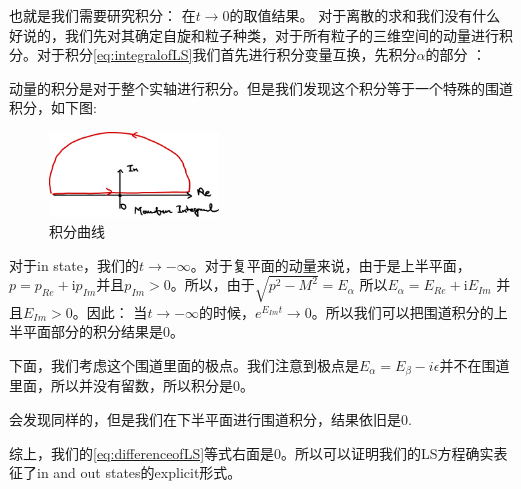 也就是我们需要研究积分：
在$ t \to 0 $的取值结果。
对于离散的求和我们没有什么好说的，我们先对其确定自旋和粒子种类，对于所有粒子的三维空间的动量进行积分。对于积分\cref{eq:integralofLS}我们首先进行积分变量互换，先积分$ \alpha $的部分 ：

动量的积分是对于整个实轴进行积分。但是我们发现这个积分等于一个特殊的围道积分，如下图:
\begin{figure}[H]
    \centering
    \includegraphics[width=0.4\textwidth]{2025-07-21-14-05-54.png}
    \caption{积分曲线}
    \label{fig:inteloop}
\end{figure}
对于in state，我们的$ t \to -\infty $。对于复平面的动量来说，由于是上半平面，$ p = p_{Re} +\mathrm{i}p_{Im}$并且$ p_{Im} >0 $。所以，由于$ \sqrt{p^2-M^2} = E_\alpha  $ 所以$ E_\alpha = E_{Re} +\mathrm{i}E_{Im} $ 并且$ E_{Im}>0 $。因此：
当$ t \to -\infty $的时候，$ e^{E_{Im}t} \to 0 $。所以我们可以把围道积分的上半平面部分的积分结果是0。

下面，我们考虑这个围道里面的极点。我们注意到极点是$ E_\alpha = E_\beta -i\epsilon $并不在围道里面，所以并没有留数，所以积分是0。


会发现同样的，但是我们在下半平面进行围道积分，结果依旧是0.

综上，我们的\cref{eq:differenceofLS}等式右面是0。所以可以证明我们的LS方程确实表征了in and out states的explicit形式。

